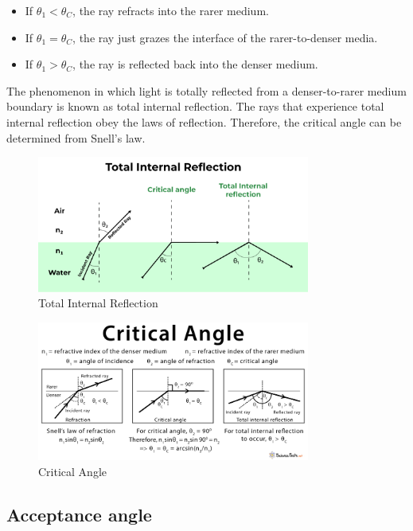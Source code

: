 \documentclass{article}
\theoremstyle{mytheoremstyle}
\theoremstyle{mytheoremstyle}
\theoremstyle{myproblemstyle}
\begin{document}
\begin{itemize}
    \item If \(\theta_1 < \theta_C\), the ray refracts into the rarer medium.
    \item If \(\theta_1 = \theta_C\), the ray just grazes the interface of the rarer-to-denser media.
    \item If \(\theta_1 > \theta_C\), the ray is reflected back into the denser medium.
\end{itemize}

The phenomenon in which light is totally reflected from a denser-to-rarer medium boundary is known as total internal reflection. The rays that experience total internal reflection obey the laws of reflection. Therefore, the critical angle can be determined from Snell's law.

\begin{figure}[ht]
    \centering
    \includegraphics[width=0.8\textwidth]{assets/total-internal-reflection.jpg}
    \caption{Total Internal Reflection}
    \label{fig:total-internal-reflection}
\end{figure}

\begin{figure}[ht]
    \centering
    \includegraphics[width=0.8\textwidth]{assets/critical-angle.jpg}
    \caption{Critical Angle}
    \label{fig:critical-angle}
\end{figure}

\subsection{Acceptance angle}
\end{document}
